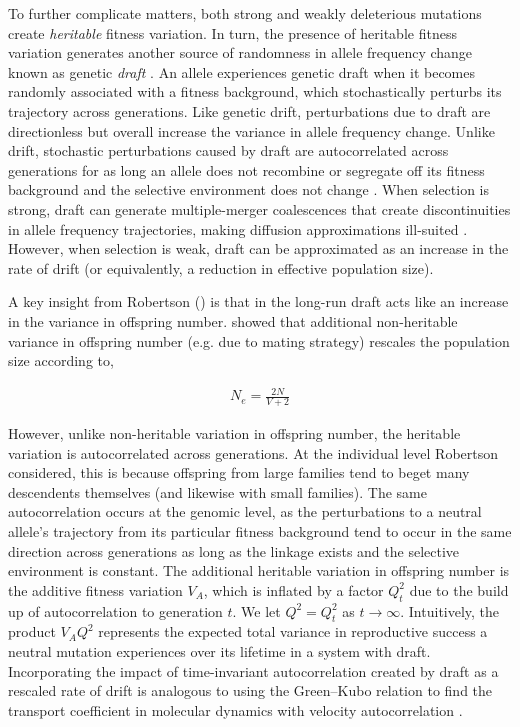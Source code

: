\documentclass[11pt]{article}
\begin{document}
To further complicate matters, both strong and weakly deleterious mutations
create \emph{heritable} fitness variation. In turn, the presence of heritable
fitness variation generates another source of randomness in allele frequency
change known as genetic \emph{draft} \parencite{Neher2013-dz}. An allele
experiences genetic draft when it becomes randomly associated with a fitness
background, which stochastically perturbs its trajectory across generations.
Like genetic drift, perturbations due to draft are directionless but overall
increase the variance in allele frequency change. Unlike drift, stochastic
perturbations caused by draft are autocorrelated across generations for as long
an allele does not recombine or segregate off its fitness background and the
selective environment does not change
\parencite{Robertson1961-ho,Santiago1995-hx,Buffalo2019-qs}. When selection is
strong, draft can generate multiple-merger coalescences that create
discontinuities in allele frequency trajectories, making diffusion
approximations ill-suited \parencite{Gillespie2000-mh,Der2011-it,Neher2013-dz}.
However, when selection is weak, draft can be approximated as an increase in
the rate of drift (or equivalently, a reduction in effective population size).

A key insight from Robertson (\citeyear{Robertson1961-ho}) is that in the
long-run draft acts like an increase in the variance in offspring number.
\textcite{Wright1938-tv} showed that additional non-heritable variance in
offspring number (e.g. due to mating strategy) rescales the population size
according to,

\begin{align}
    \label{eq:simple_Ne}
    N_e = \frac{2N}{V + 2}
\end{align}

However, unlike non-heritable variation in offspring number, the heritable
variation is autocorrelated across generations. At the individual level
Robertson considered, this is because offspring from large families tend to
beget many descendents themselves (and likewise with small families). The same
autocorrelation occurs at the genomic level, as the perturbations to a neutral
allele's trajectory from its particular fitness background tend to occur in the
same direction across generations as long as the linkage exists and the
selective environment is constant. The additional heritable variation in
offspring number is the additive fitness variation $V_A$, which is inflated by
a factor $Q_t^2$ due to the build up of autocorrelation to generation $t$. We
let $Q^2 = Q_t^2$ as $t \to \infty$. Intuitively, the product $V_A Q^2$
represents the expected total variance in reproductive success a neutral
mutation experiences over its lifetime in a system with draft. Incorporating
the impact of time-invariant autocorrelation created by draft as a rescaled
rate of drift is analogous to using the Green--Kubo relation to find the
transport coefficient in molecular dynamics with velocity autocorrelation
\parencite{Green1954-kl,Kubo1957-va}.
\end{document}
